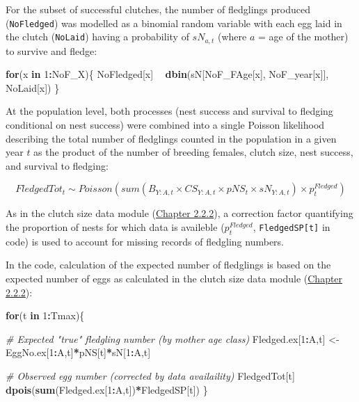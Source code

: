 \documentclass[
]{book}
\newenvironment{Shaded}{\begin{snugshade}}{\end{snugshade}}
\newcommand{\CommentTok}[1]{\textcolor[rgb]{0.56,0.35,0.01}{\textit{#1}}}
\newcommand{\ControlFlowTok}[1]{\textcolor[rgb]{0.13,0.29,0.53}{\textbf{#1}}}
\newcommand{\DecValTok}[1]{\textcolor[rgb]{0.00,0.00,0.81}{#1}}
\newcommand{\KeywordTok}[1]{\textcolor[rgb]{0.13,0.29,0.53}{\textbf{#1}}}
\newcommand{\NormalTok}[1]{#1}
\newcommand{\OperatorTok}[1]{\textcolor[rgb]{0.81,0.36,0.00}{\textbf{#1}}}
\newcommand{\StringTok}[1]{\textcolor[rgb]{0.31,0.60,0.02}{#1}}
\begin{document}
For the subset of successful clutches, the number of fledglings produced
(\texttt{NoFledged}) was modelled as a binomial random variable with each egg laid in
the clutch (\texttt{NoLaid}) having a probability of \(sN_{a,t}\) (where \(a\) = age of the
mother) to survive and fledge:

\begin{Shaded}
\begin{Highlighting}[]
\ControlFlowTok{for}\NormalTok{(x }\ControlFlowTok{in} \DecValTok{1}\OperatorTok{:}\NormalTok{NoF_X)\{}
\NormalTok{    NoFledged[x] }\OperatorTok{~}\StringTok{ }\KeywordTok{dbin}\NormalTok{(sN[NoF_FAge[x], NoF_year[x]], NoLaid[x])}
\NormalTok{\}}
\end{Highlighting}
\end{Shaded}

At the population level, both processes (nest success and survival to fledging
conditional on nest success) were combined into a single Poisson
likelihood describing the total number of fledglings counted in the population
in a given year \(t\) as the product of the number of breeding females, clutch
size, nest success, and survival to fledging:

\begin{equation}
FledgedTot_t  \sim Poisson(sum(B_{Y:A,t}\times CS_{Y:A,t}\times pNS_t\times sN_{Y:A,t}) \times p_t^{Fledged})
\end{equation}

As in the clutch size data module (\protect\hyperlink{ux5cux23ux5cux23ux5cux2520Clutchux5cux2520sizeux5cux2520dataux5cux2520likelihoods}{Chapter 2.2.2}),
a correction factor quantifying the proportion of nests for which data is
availeble (\(p_t^{Fledged}\), \texttt{FledgedSP{[}t{]}} in code) is used to account for
missing records of fledgling numbers.

In the code, calculation of the expected number of fledglings is based on the expected number of eggs as calculated in the clutch size data module
(\protect\hyperlink{ux5cux23ux5cux23ux5cux2520Clutchux5cux2520sizeux5cux2520dataux5cux2520likelihoods}{Chapter 2.2.2}):

\begin{Shaded}
\begin{Highlighting}[]
\ControlFlowTok{for}\NormalTok{(t }\ControlFlowTok{in} \DecValTok{1}\OperatorTok{:}\NormalTok{Tmax)\{}

    \CommentTok{# Expected "true" fledgling number (by mother age class)}
\NormalTok{    Fledged.ex[}\DecValTok{1}\OperatorTok{:}\NormalTok{A,t] <-}\StringTok{ }\NormalTok{EggNo.ex[}\DecValTok{1}\OperatorTok{:}\NormalTok{A,t]}\OperatorTok{*}\NormalTok{pNS[t]}\OperatorTok{*}\NormalTok{sN[}\DecValTok{1}\OperatorTok{:}\NormalTok{A,t]}

    \CommentTok{# Observed egg number (corrected by data availaility)}
\NormalTok{    FledgedTot[t] }\OperatorTok{~}\StringTok{ }\KeywordTok{dpois}\NormalTok{(}\KeywordTok{sum}\NormalTok{(Fledged.ex[}\DecValTok{1}\OperatorTok{:}\NormalTok{A,t])}\OperatorTok{*}\NormalTok{FledgedSP[t])}
\NormalTok{\}}
\end{Highlighting}
\end{Shaded}
\end{document}
